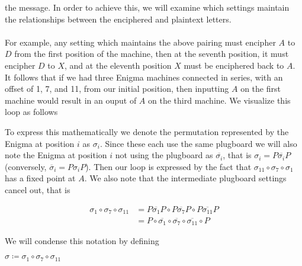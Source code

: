the message.  In order to achieve this,
we will examine which settings maintain the relationships between the
enciphered and plaintext letters.
\\\\For example, any setting which maintains the above pairing must
encipher $A$ to $D$ from the first position of the machine, then at
the seventh position, it must encipher $D$ to $X$, and at the
eleventh position $X$ must be enciphered back to $A$. It follows that if we had
three Enigma machines connected in series, with an offset of 1, 7,
and 11, from our initial position, then inputting $A$ on the first
machine would result in an ouput of $A$ on the
third machine. We visualize this loop as follows
\begin{center}
\end{center}
To express this mathematically we denote the permutation represented
by the Enigma at
position $i$ as $\sigma_i$. Since these each use the same plugboard
we will also note the
Enigma at position $i$ not using the plugboard as
$\overline{\sigma_i}$, that is $\sigma_i = P\overline{\sigma_i}P$
(conversely, $\overline\sigma_i = P\sigma_iP$).
Then our loop is expressed by the fact that
$\sigma_{11}\circ\sigma_7\circ\sigma_1$ has a fixed point at $A$.
We also note that the intermediate plugboard settings cancel out, that is
\begin{center}
  \begin{align*}
    \sigma_{1}\circ\sigma_7\circ\sigma_{11} &=
    P\overline{\sigma_{1}}P\circ P\overline{\sigma_7}P\circ
    P\overline{\sigma_{11}}P
    \\&= P\circ
    \overline{\sigma_{1}}\circ\overline{\sigma_7}\circ\overline{\sigma_{11}}\circ
    P
  \end{align*}
\end{center}
We will condense this notation by defining
\begin{center}
  $\sigma \coloneq \sigma_{1}\circ\sigma_7\circ\sigma_{11}$
\end{center}
